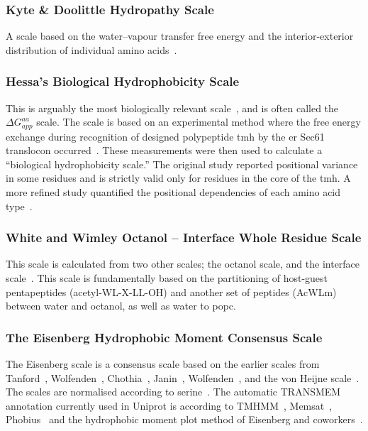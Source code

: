 
\subsubsection{Kyte \& Doolittle Hydropathy Scale}

A scale based on the water\---vapour transfer free energy and the interior-exterior distribution of individual amino acids~\cite{Kyte1982}.

\subsubsection{Hessa's Biological Hydrophobicity Scale}

This is arguably the most biologically relevant scale~\cite{Peters2014}, and is often called the ${\Delta G}_{app}^{aa}$ scale.
The scale is based on an experimental method where the free energy exchange during recognition of designed polypeptide \gls{tmh} by the \gls{er} Sec61 translocon occurred~\cite{Hessa2005}.
These measurements were then used to calculate a “biological hydrophobicity scale.” The original study reported positional variance in some residues and is strictly valid only for residues in the core of the \gls{tmh}.
A more refined study quantified the positional dependencies of each amino acid type~\cite{Hessa2007}.

\subsubsection{White and Wimley Octanol \--- Interface Whole Residue Scale}

This scale is calculated from two other scales; the octanol scale, and the interface scale~\cite{White1999}.
This scale is fundamentally based on the partitioning of host-guest pentapeptides (acetyl-WL-X-LL-OH) and another set of peptides (AcWLm) between water and octanol, as well as water to \gls{popc}.

\subsubsection{The Eisenberg Hydrophobic Moment Consensus Scale}

The Eisenberg scale is a consensus scale based on the earlier scales from Tanford~\cite{Nozaki1971}, Wolfenden~\cite{Rose1993}, Chothia~\cite{Chothia1976}, Janin~\cite{Janin1979},  Wolfenden~\cite{Wolfenden1981}, and the von Heijne scale~\cite{VonHeijne1979}.
The scales are normalised according to serine~\cite{Eisenberg1984}.
The automatic TRANSMEM annotation currently used in Uniprot is according to TMHMM~\cite{Krogh2001}, Memsat~\cite{Jones2007}, Phobius~\cite{Kall2004} and the hydrophobic moment plot method of Eisenberg and coworkers~\cite{Eisenberg1984}.



